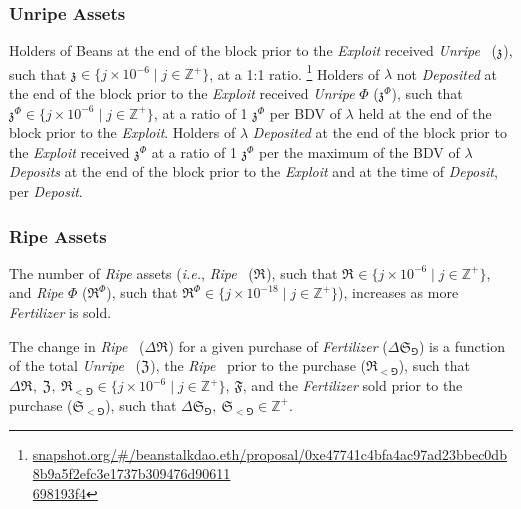 \documentclass[tikz]{article}
\newcommand{\term}[1]{\textsl{#1}}
\newcommand{\Bean}{} %
\newcommand{\bean}{} %
\begin{document}
\subsubsection{Unripe Assets}
Holders of Beans at the end of the block prior to the \term{Exploit} received \term{Unripe} \Bean\ ($\mathfrak{z}^{\bean}$), such that $\mathfrak{z}^{\bean} \in \{j \times 10^{-6} \mid j \in \mathbb{Z}^{+} \}$, at a 1:1 ratio. \footnote{\href{https://snapshot.org/\#/beanstalkdao.eth/proposal/0xe47741c4bfa4ac97ad23bbec0db8b9a5f2efc3e1737b309476d90611698193f4}{snapshot.org/\#/beanstalkdao.eth/proposal/0xe47741c4bfa4ac97ad23bbec0db8b9a5f2efc3e1737b309476d90611\\698193f4}} Holders of $\lambda$ not \term{Deposited} at the end of the block prior to the \term{Exploit} received \term{Unripe} $\Phi$ ($\mathfrak{z}^{\Phi}$), such that $\mathfrak{z}^{\Phi} \in \{j \times 10^{-6} \mid j \in \mathbb{Z}^{+} \}$, at a ratio of 1 $\mathfrak{z}^{\Phi}$ per BDV of $\lambda$ held at the end of the block prior to the \term{Exploit}. Holders of $\lambda$ \term{Deposited} at the end of the block prior to the \term{Exploit} received $\mathfrak{z}^{\Phi}$ at a ratio of 1 $\mathfrak{z}^{\Phi}$ per the maximum of the BDV of $\lambda$ \term{Deposits} at the end of the block prior to the \term{Exploit} and at the time of \term{Deposit}, per \term{Deposit}. 

\subsubsection{Ripe Assets}
The number of \term{Ripe} assets (\term{i.e.}, \term{Ripe} \Bean\ ($\mathfrak{R}^{\bean}$), such that $\mathfrak{R}^{\bean} \in \{j \times 10^{-6} \mid j \in \mathbb{Z}^{+} \}$, and \term{Ripe} $\Phi$ ($\mathfrak{R}^{\Phi}$), such that $\mathfrak{R}^{\Phi} \in \{j \times 10^{-18} \mid j \in \mathbb{Z}^{+} \}$), increases as more \term{Fertilizer} is sold.

The change in \term{Ripe} \Bean\ ($\Delta \mathfrak{R}^{\bean}$) for a given purchase of \term{Fertilizer} ($\Delta \mathfrak{S}_{\Game}$) is a function of the total \term{Unripe} \Bean\ ($\mathfrak{Z}^{\bean}$), the \term{Ripe} \Bean\ prior to the purchase ($\mathfrak{R}_{<\Game}^{\bean}$),  such that $\Delta \mathfrak{R}^{\bean},\ \mathfrak{Z}^{\bean},\ \mathfrak{R}_{<\Game}^{\bean} \in \{j \times 10^{-6} \mid j \in \mathbb{Z}^{+} \}$, $\mathfrak{F}$, and the \term{Fertilizer} sold prior to the purchase ($\mathfrak{S}_{<\Game}$),  such that $\Delta \mathfrak{S}_{\Game},\ \mathfrak{S}_{<\Game} \in \mathbb{Z}^{+}$.
\end{document}
